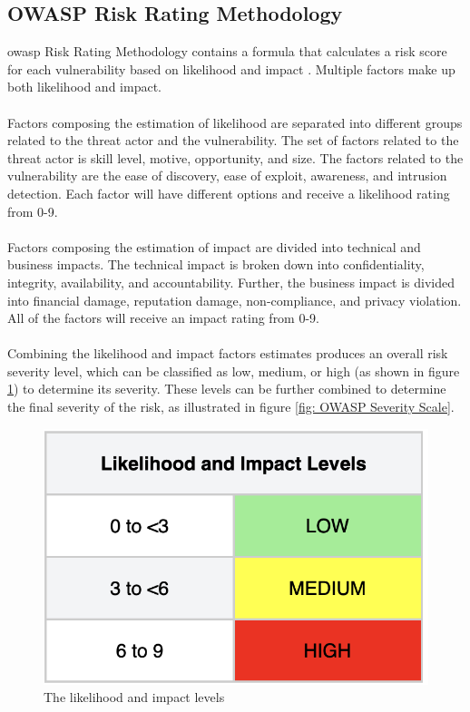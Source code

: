 \subsection{OWASP Risk Rating Methodology}
\acrshort{owasp} Risk Rating Methodology contains a formula that calculates a risk score for each vulnerability based on likelihood and impact \cite{owasprisk}. Multiple factors make up both likelihood and impact. 
\\~\\
Factors composing the estimation of likelihood are separated into different groups related to the threat actor and the vulnerability. The set of factors related to the threat actor is skill level, motive, opportunity, and size. The factors related to the vulnerability are the ease of discovery, ease of exploit, awareness, and intrusion detection. Each factor will have different options and receive a likelihood rating from 0-9. 
\\~\\
Factors composing the estimation of impact are divided into technical and business impacts. The technical impact is broken down into confidentiality, integrity, availability, and accountability. Further, the business impact is divided into financial damage, reputation damage, non-compliance, and privacy violation. All of the factors will receive an impact rating from 0-9. 
\\~\\
Combining the likelihood and impact factors estimates produces an overall risk severity level, which can be classified as low, medium, or high (as shown in figure \ref{fig: Impact levels}) to determine its severity. These levels can be further combined to determine the final severity of the risk, as illustrated in figure \ref{fig: OWASP Severity Scale}.


\vspace{2mm}
\begin{figure}[H]
    \centering
    \includegraphics[scale=0.5]{Images/OWASP-likelihood.png}
    \caption{The likelihood and impact levels}
    \label{fig: Impact levels}
\end{figure}

